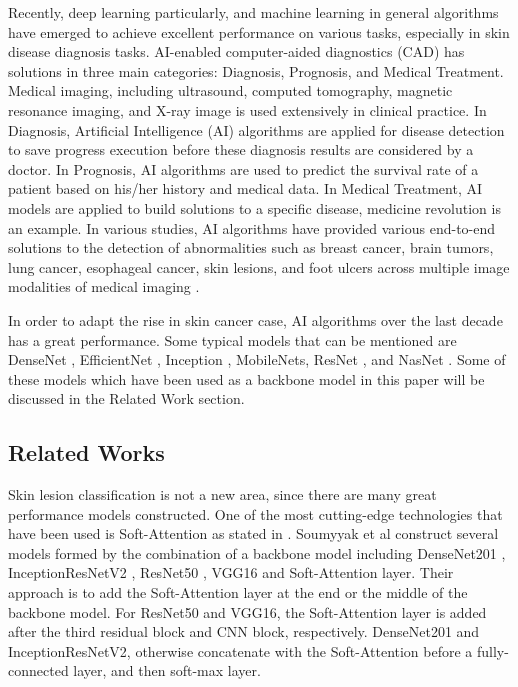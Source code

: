 \documentclass[sensors,article,submit,pdftex,moreauthors]{Definitions/mdpi}
\begin{document}
Recently, deep learning particularly, and machine learning in general algorithms have emerged to achieve excellent performance on various tasks, especially in skin disease diagnosis tasks. AI-enabled computer-aided diagnostics (CAD) has solutions in three main categories: Diagnosis, Prognosis, and Medical Treatment. Medical imaging, including ultrasound, computed tomography, magnetic resonance imaging, and X-ray image is used extensively in clinical practice. In Diagnosis, Artificial Intelligence (AI) algorithms are applied for disease detection to save progress execution before these diagnosis results are considered by a doctor. In Prognosis, AI algorithms are used to predict the survival rate of a patient based on his/her history and medical data. In Medical Treatment, AI models are applied to build solutions to a specific disease, medicine revolution is an example. In various studies, AI algorithms have provided various end-to-end solutions to the detection of abnormalities such as breast cancer, brain tumors, lung cancer, esophageal cancer, skin lesions, and foot ulcers across multiple image modalities of medical imaging \cite{11872}.

In order to adapt the rise in skin cancer case, AI algorithms over the last decade has a great performance. Some typical models that can be mentioned are DenseNet \cite{06993}, EfficientNet \cite{04861}, Inception \cite{00567}, MobileNets\cite{04861}\cite{04381}\cite{02244}, ResNet \cite{03385} \cite{05027}, and NasNet \cite{07012}. Some of these models which have been used as a backbone model in this paper will be discussed in the Related Work section.

\subsection{Related Works}
Skin lesion classification is not a new area, since there are many great performance models constructed. One of the most cutting-edge technologies that have been used is Soft-Attention as stated in \cite{03358}. Soumyyak et al construct several models formed by the combination of a backbone model including DenseNet201 \cite{06993}, InceptionResNetV2 \cite{00567}, ResNet50 \cite{03385} \cite{05027}, VGG16 \cite{1556} and Soft-Attention layer. Their approach is to add the Soft-Attention layer at the end or the middle of the backbone model. For ResNet50 and VGG16, the Soft-Attention layer is added after the third residual block and CNN block, respectively. DenseNet201 and InceptionResNetV2, otherwise concatenate with the Soft-Attention before a fully-connected layer, and then soft-max layer.
\end{document}
